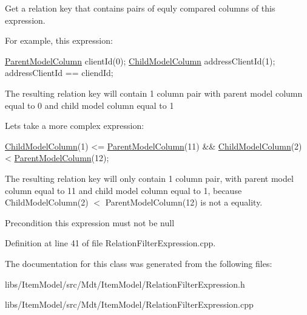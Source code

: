 Get a relation key that contains pairs of equly compared columns of this expression. 

For example, this expression\+: 
\begin{DoxyCode}
\hyperlink{namespace_mdt_1_1_item_model_a65a3c4f6cfb3d80d7f69e58cd17d8be7}{ParentModelColumn} clientId(0);
\hyperlink{namespace_mdt_1_1_item_model_a60ac754611ae43e31bbe5244b2d24297}{ChildModelColumn} addressClientId(1);
addressClientId == cliendId;
\end{DoxyCode}
 The resulting relation key will contain 1 column pair with parent model column equal to 0 and child model column equal to 1

Lets take a more complex expression\+: 
\begin{DoxyCode}
\hyperlink{namespace_mdt_1_1_item_model_a60ac754611ae43e31bbe5244b2d24297}{ChildModelColumn}(1) <= \hyperlink{namespace_mdt_1_1_item_model_a65a3c4f6cfb3d80d7f69e58cd17d8be7}{ParentModelColumn}(11) && 
      \hyperlink{namespace_mdt_1_1_item_model_a60ac754611ae43e31bbe5244b2d24297}{ChildModelColumn}(2) < \hyperlink{namespace_mdt_1_1_item_model_a65a3c4f6cfb3d80d7f69e58cd17d8be7}{ParentModelColumn}(12);
\end{DoxyCode}
 The resulting relation key will only contain 1 column pair, with parent model column equal to 11 and child model column equal to 1, because Child\+Model\+Column(2) $<$ Parent\+Model\+Column(12) is not a equality.

\begin{DoxyPrecond}{Precondition}
this expression must not be null 
\end{DoxyPrecond}


Definition at line 41 of file Relation\+Filter\+Expression.\+cpp.



The documentation for this class was generated from the following files\+:\begin{DoxyCompactItemize}
\item 
libs/\+Item\+Model/src/\+Mdt/\+Item\+Model/Relation\+Filter\+Expression.\+h\item 
libs/\+Item\+Model/src/\+Mdt/\+Item\+Model/Relation\+Filter\+Expression.\+cpp\end{DoxyCompactItemize}

